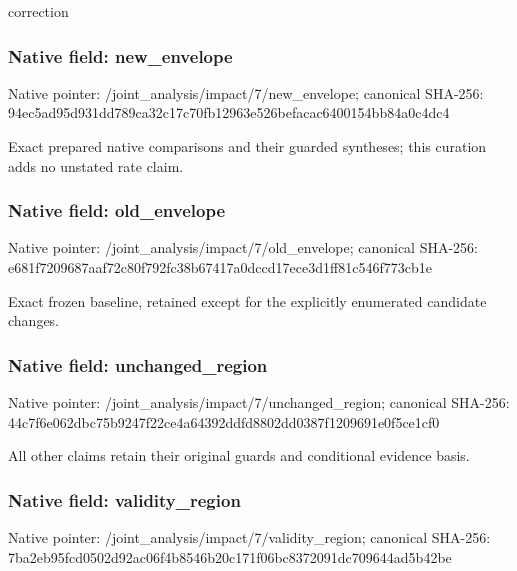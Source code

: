 \documentclass[10pt,a4paper]{article}
\begin{document}
\begingroup\raggedright\sloppy correction\par\endgroup

\subsubsection{Native field: new\_\allowbreak{}envelope}
Native pointer: /joint\_\allowbreak{}analysis/impact/7/new\_\allowbreak{}envelope; canonical SHA-256: 94ec5ad95d931dd789ca32c17c70fb12963e526befacac6400154bb84a0c4dc4

\begingroup\raggedright\sloppy Exact prepared native comparisons and their guarded syntheses;\allowbreak{} this curation adds no unstated rate claim.\par\endgroup

\subsubsection{Native field: old\_\allowbreak{}envelope}
Native pointer: /joint\_\allowbreak{}analysis/impact/7/old\_\allowbreak{}envelope; canonical SHA-256: e681f7209687aaf72c80f792fc38b67417a0dccd17ece3d1ff81c546f773cb1e

\begingroup\raggedright\sloppy Exact frozen baseline,\allowbreak{} retained except for the explicitly enumerated candidate changes.\par\endgroup

\subsubsection{Native field: unchanged\_\allowbreak{}region}
Native pointer: /joint\_\allowbreak{}analysis/impact/7/unchanged\_\allowbreak{}region; canonical SHA-256: 44c7f6e062dbc75b9247f22ce4a64392ddfd8802dd0387f1209691e0f5ce1cf0

\begingroup\raggedright\sloppy All other claims retain their original guards and conditional evidence basis.\par\endgroup

\subsubsection{Native field: validity\_\allowbreak{}region}
Native pointer: /joint\_\allowbreak{}analysis/impact/7/validity\_\allowbreak{}region; canonical SHA-256: 7ba2eb95fcd0502d92ac06f4b8546b20c171f06bc8372091dc709644ad5b42be
\end{document}
